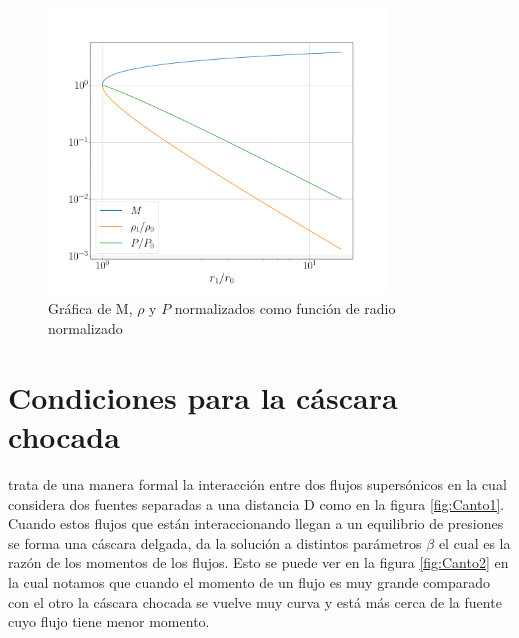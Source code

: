 \documentclass{book}
\begin{document}
\begin{figure}[h]
    \centering    \includegraphics[width=0.8\textwidth]{images Chapter 2/Model.pdf}
    \caption{Gráfica de M, $\rho$ y $P$ normalizados como función de radio normalizado}
    \label{fig:grafica_C2}
\end{figure}

\section{Condiciones para la cáscara chocada}

\cite{Canto:1996} trata de una manera formal la interacción entre dos flujos supersónicos en la cual considera dos fuentes separadas a una distancia D como en la figura \ref{fig:Canto1}. Cuando estos flujos que están interaccionando llegan a un equilibrio de presiones se forma una cáscara delgada, \cite{Canto:1996} da la solución a distintos parámetros $\beta$ el cual es la razón de los momentos de los flujos. Esto se puede ver en la figura \ref{fig:Canto2} en la cual notamos que cuando el momento de un flujo es muy  grande comparado con el otro la cáscara chocada se vuelve muy curva y está más cerca de la fuente cuyo flujo tiene menor momento.
\end{document}
